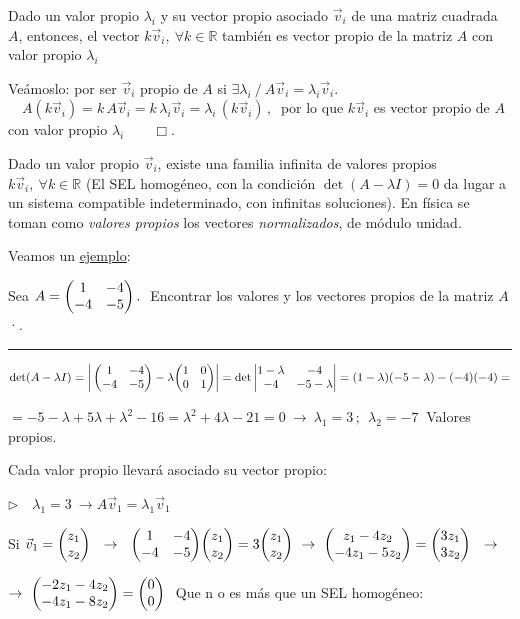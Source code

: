 Dado un valor propio $\lambda_i$ y su vector propio asociado $\vec v_i$ de una matriz cuadrada $A$, entonces, el vector $k\vec v_i,\ \forall k\in \mathbb R$ también es vector propio de la matriz $A$ con valor propio $\lambda_i$

Veámoslo: por ser $\vec v_i$ propio de $A$ si $\exists \lambda_i \ / \ A\vec v_i=\lambda_i \vec v_i.$
$\quad A(k\vec v_i)=k\, A\vec v_i= k\, \lambda_i \vec v_i = \lambda_i\,  (k \vec v_i)\, , \ $ por lo que $k\vec v_i$ es vector propio de $A$ con valor propio $\lambda_i \qquad \Box$. 

Dado un valor propio $\vec v_i$, existe una familia infinita de valores propios $k\vec v_i,\ \forall k\in \mathbb R$ (El SEL homogéneo, con la condición $\det(A-\lambda I)=0$ da lugar a un sistema compatible indeterminado, con infinitas soluciones). En física se toman como \emph{valores propios} los vectores \emph{normalizados}, de módulo unidad.

\color{gris}
\vspace{5mm} Veamos un \underline{ejemplo}:

Sea $A=\mqty(1&-4\\-4&-5)\, . \ $ Encontrar los valores y los vectores propios de la matriz $A$·.

\rule{200pt}{0.1pt}

$\det(A-\lambda I)=\left| \,\mqty(1&-4\\-4&-5) - \lambda \mqty(1&0\\0&1) \right|=\det \left| \mqty{1-\lambda & -4\\-4& -5-\lambda} \right|=  (1-\lambda)(-5-\lambda)-(-4)(-4) =  $

$=-5-\lambda+5\lambda+\lambda^2-16=\lambda^2+4\lambda-21=0 \ \to \ \lambda_1=3\, ; \ \ \lambda_2=-7\ $ Valores propios.

Cada valor propio llevará asociado su vector propio:

\vspace{5mm} $\triangleright \quad \boxed{\lambda_1=3} \ \to A\vec v_1=\lambda_1 \vec v_1$

Si $\vec v_1=\mqty(z_1\\z_2) \ \ \to \ \ \mqty(1&-4\\-4&-5)\mqty(z_1\\z_2)=3\mqty(z_1\\z_2) \ \to \ \mqty(z_1-4z_2\\-4z_1-5z_2)=\mqty(3z_1\\3z_2) \ \ \to \ $

$\to \  \mqty(-2z_1-4z_2\\-4z_1-8z_2)=\mqty(0\\0)\ $ Que n o es más que un  SEL homogéneo:

